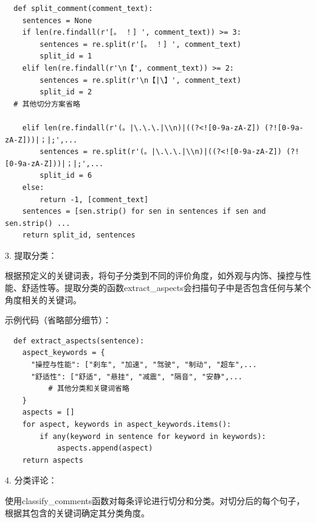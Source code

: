 \documentclass[UTF8,a4paper,15pt,titlepage,oneside]{ctexbook}
\begin{document}
\begin{mdframed}[backgroundcolor=darkgray, linecolor=lightgray, linewidth=1pt, innermargin=0.5cm, outermargin=0.5cm, skipbelow=0.1cm]
  \color{white}
  \begin{verbatim}
  def split_comment(comment_text):
    sentences = None
    if len(re.findall(r'[。 ！] ', comment_text)) >= 3:
        sentences = re.split(r'[。 ！] ', comment_text)
        split_id = 1
    elif len(re.findall(r'\n【', comment_text)) >= 2:
        sentences = re.split(r'\n【|\】', comment_text)
        split_id = 2
  # 其他切分方案省略

	elif len(re.findall(r'(。|\.\.\.|\\n)|((?<![0-9a-zA-Z]) (?![0-9a-zA-Z]))|；|;',...
		sentences = re.split(r'(。|\.\.\.|\\n)|((?<![0-9a-zA-Z]) (?![0-9a-zA-Z]))|；|;',...
		split_id = 6
    else:
        return -1, [comment_text]
    sentences = [sen.strip() for sen in sentences if sen and sen.strip() ...
    return split_id, sentences
    \end{verbatim}
\vspace{-1.5em} %
\end{mdframed}

3.	提取分类：

根据预定义的关键词表，将句子分类到不同的评价角度，如外观与内饰、操控与性能、舒适性等。提取分类的函数extract\_aspects会扫描句子中是否包含任何与某个角度相关的关键词。

示例代码（省略部分细节）：

\begin{mdframed}[backgroundcolor=darkgray, linecolor=lightgray, linewidth=1pt, innermargin=0.5cm, outermargin=0.5cm, skipbelow=0.1cm]
  \color{white}
  \begin{verbatim}
  def extract_aspects(sentence):
    aspect_keywords = {
      "操控与性能": ["刹车", "加速", "驾驶", "制动", "超车",...
      "舒适性": ["舒适", "悬挂", "减震", "隔音", "安静",...
		  # 其他分类和关键词省略
    }
    aspects = []
    for aspect, keywords in aspect_keywords.items():
        if any(keyword in sentence for keyword in keywords):
            aspects.append(aspect)
    return aspects
    \end{verbatim}
\vspace{-1.5em} %
\end{mdframed}

4.	分类评论：

使用classify\_comments函数对每条评论进行切分和分类。对切分后的每个句子，根据其包含的关键词确定其分类角度。
\end{document}
